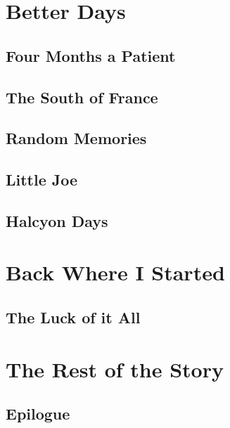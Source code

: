 \part{Better Days}\label{better-days}


\chapter{Four Months a Patient}\label{four-months-a-patient}


\chapter{The South of France}\label{the-south-of-france}


\chapter{Random Memories}\label{random-memories-2}


\chapter{Little Joe}\label{little-joe}


\chapter{Halcyon Days}\label{halcyon-days}


\part{Back Where I Started}\label{back-where-i-started}
\chapter{The Luck of it All}\label{return-sailing}


\part{The Rest of the Story}\label{rest-of-the-story}
\chapter*[Epilogue]{Epilogue}\label{epilogue}


